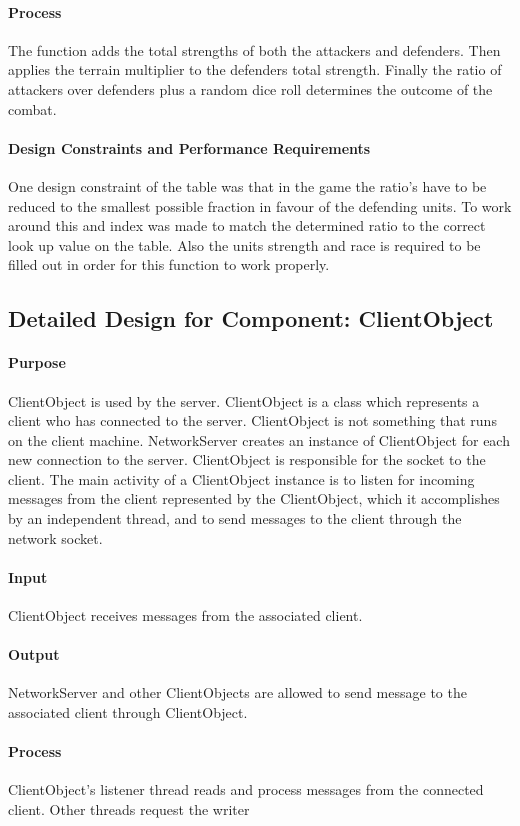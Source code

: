 \documentclass[12pt,a4paper,titlepage]{article}
\begin{document}
\paragraph{Process} The function adds the total strengths of both the attackers and defenders. Then applies the terrain multiplier to the defenders total strength. Finally the ratio of attackers over defenders plus a random dice roll determines the outcome of the combat.  
\paragraph{Design Constraints and Performance Requirements} One design constraint of the table was that in the game the ratio's have to be reduced to the smallest possible fraction in favour of the defending units. To work around this and index was made to match the determined ratio to the correct look up value on the table. Also the units strength and race is required to be filled out in order for this function to work properly. 

\subsection{Detailed Design for Component: ClientObject }
\paragraph{Purpose} ClientObject is used by the server. ClientObject is a class which represents a client who has connected to the server. ClientObject is not something that runs on the client machine. NetworkServer creates an instance of ClientObject for each new connection to the server. ClientObject is responsible for the socket to the client. The main activity of a ClientObject instance is to listen for incoming messages from the client represented by the ClientObject, which it accomplishes by an independent thread, and to send messages to the client through the network socket.
\paragraph{Input} ClientObject receives messages from the associated client. 
\paragraph{Output} NetworkServer and other ClientObjects are allowed
to send message to the associated client through ClientObject.
\paragraph{Process} ClientObject's listener thread reads and process messages from the connected client. Other threads request the writer
\end{document}
